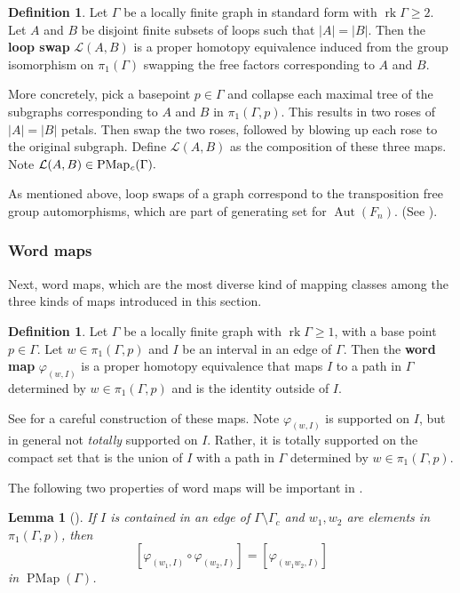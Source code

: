 \documentclass[11pt]{amsart}
\theoremstyle{plain}
\newtheorem{LEM}[THM]{Lemma}
\theoremstyle{definition}
\newtheorem{DEF}[THM]{Definition}
\DeclareMathOperator{\Aut}{Aut}
\DeclareMathOperator{\PMap}{PMap}
\DeclareMathOperator{\PMapc}{PMap_{\it c}}
\DeclareMathOperator{\rk}{rk}
\newcommand{\cL}{\mathcal{L}}
\def\G{{\Gamma}}
\newcommand{\<}{\langle}
\renewcommand{\>}{\rangle}
\begin{document}
    \begin{DEF}
        Let $\G$ be a locally finite graph in standard form with $\rk \G \ge 2$. Let $A$ and $B$ be disjoint finite subsets of loops such that $|A|=|B|$. Then the \textbf{loop swap} $\cL(A,B)$ is a proper homotopy equivalence induced from the group isomorphism on $\pi_1(\G)$ swapping the free factors corresponding to $A$ and $B$.
        
        More concretely, pick a basepoint $p \in \G$ and collapse each maximal tree of the subgraphs corresponding to $A$ and $B$ in $\pi_1(\G,p)$. This results in two roses of $|A|=|B|$ petals. Then swap the two roses, followed by blowing up each rose to the original subgraph. Define $\cL(A,B)$ as the composition of these three maps. Note $\cL(A,B) \in \PMapc(\G).$
    \end{DEF}
    As mentioned above, loop swaps of a graph correspond to the transposition free group automorphisms, which are part of generating set for $\Aut(F_n)$. (See ).

\subsubsection{Word maps}
    Next, word maps, which are the most diverse kind of mapping classes among the three kinds of maps introduced in this section.
\begin{DEF}
    Let $\G$ be a locally finite graph with $\rk \G \ge 1$, with a base point $p \in \G$. Let $w \in \pi_1(\G,p)$ and $I$ be an interval in an edge of $\G$. Then the \textbf{word map} $\varphi_{(w,I)}$ is a proper homotopy equivalence that maps $I$ to a path in $\G$ determined by $w \in \pi_1(\G,p)$ and is the identity outside of $I$.
\end{DEF}

    See \cite[Section 3.3]{DHK2023} for a careful construction of these maps. Note $\varphi_{(w,I)}$ is supported on $I$, but in general not \emph{totally} supported on $I$. Rather, it is totally supported on the compact set that is the union of $I$ with a path in $\G$ determined by $w \in \pi_1(\G,p)$.

    The following two properties of word maps will be important in .
    \begin{LEM}[{\cite[Lemma 3.5]{DHK2023}}] \label{lem:compositionLaw}
        If $I$ is contained in an edge of $\G \setminus \G_c$ and $w_1,w_2$ are elements in $\pi_1(\G,p)$, then
        \[
            [\varphi_{(w_1,I)} \circ \varphi_{(w_2,I)}] = [\varphi_{(w_1w_2,I)}]
        \]
        in $\PMap(\G)$.
    \end{LEM}
\end{document}
